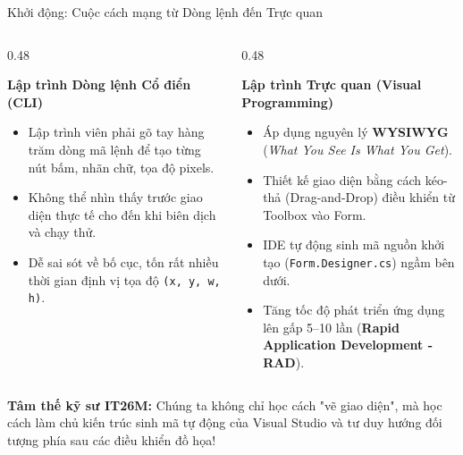 \documentclass[aspectratio=169, 10pt]{beamer}
\begin{document}
\begin{frame}{Khởi động: Cuộc cách mạng từ Dòng lệnh đến Trực quan}
  \begin{columns}[T]
    \begin{column}{0.48\textwidth}
      \begin{block}{\textbf{Lập trình Dòng lệnh Cổ điển (CLI)}}
        \begin{itemize}\small
          \item Lập trình viên phải gõ tay hàng trăm dòng mã lệnh để tạo từng nút bấm, nhãn chữ, tọa độ pixels.
          \item Không thể nhìn thấy trước giao diện thực tế cho đến khi biên dịch và chạy thử.
          \item Dễ sai sót về bố cục, tốn rất nhiều thời gian định vị tọa độ \texttt{(x, y, w, h)}.
        \end{itemize}
      \end{block}
    \end{column}

    \begin{column}{0.48\textwidth}
      \begin{exampleblock}{\textbf{Lập trình Trực quan (Visual Programming)}}
        \begin{itemize}\small
          \item Áp dụng nguyên lý \textbf{WYSIWYG} (\textit{What You See Is What You Get}).
          \item Thiết kế giao diện bằng cách kéo-thả (Drag-and-Drop) điều khiển từ Toolbox vào Form.
          \item IDE tự động sinh mã nguồn khởi tạo (\texttt{Form.Designer.cs}) ngầm bên dưới.
          \item Tăng tốc độ phát triển ứng dụng lên gấp 5--10 lần (\textbf{Rapid Application Development - RAD}).
        \end{itemize}
      \end{exampleblock}
    \end{column}
  \end{columns}
  \vspace{2mm}
  \begin{alertblock}{\textbf{Tâm thế kỹ sư IT26M:}}
    Chúng ta không chỉ học cách "vẽ giao diện", mà học cách làm chủ kiến trúc sinh mã tự động của Visual Studio và tư duy hướng đối tượng phía sau các điều khiển đồ họa!
  \end{alertblock}
\end{frame}
\end{document}
